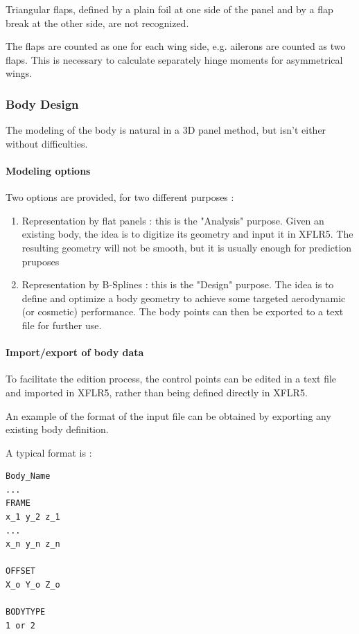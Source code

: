 \documentclass[a4paper,twoside,12pt,dvips]{article}
\begin{document}
Triangular flaps, defined by a plain foil at one side of the panel and
by a flap break at the other side, are not recognized.

The flaps are counted as one for each wing side, e.g. ailerons are
counted as two flaps. This is necessary to calculate separately hinge
moments for asymmetrical wings.

\subsubsection{Body Design}

The modeling of the body is natural in a 3D panel method, but isn't
either without difficulties.

\paragraph{Modeling options}

Two options are provided, for two different purposes :

\begin{enumerate}
\item Representation by flat panels : this is the "Analysis"
purpose. \newline
Given an existing body, the idea is to digitize its geometry and
input it in XFLR5. The resulting geometry will not be smooth, but it
is usually enough for prediction pruposes
\item Representation by B-Splines : this is the "Design"
purpose. \newline
The idea is to define and optimize a body geometry to achieve some
targeted aerodynamic (or cosmetic) performance. The body points can
then be exported to a text file for further use.
\end{enumerate}

\paragraph{Import/export of body data}

To facilitate the edition process, the control points can be edited in
a text file and imported in XFLR5, rather than being defined directly
in XFLR5.

An example of the format of the input file can be obtained by
exporting any existing body definition.

A typical format is :

\begin{verbatim}
Body_Name
...
FRAME
x_1 y_2 z_1
...
x_n y_n z_n

OFFSET
X_o Y_o Z_o

BODYTYPE
1 or 2
\end{verbatim}
\end{document}

